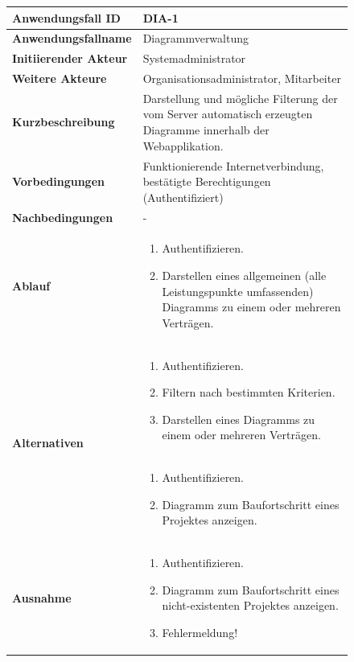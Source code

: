 \begin{figure}[h]
	\centering
	\begin{tabularx}{\textwidth}{ X | X }
		\textbf{Anwendungsfall ID} & DIA-1 \\ \hline
		\textbf{Anwendungsfallname} & Diagrammverwaltung \\ \hline
		\textbf{Initiierender Akteur} & Systemadministrator \\ \hline
		\textbf{Weitere Akteure} & Organisationsadministrator, Mitarbeiter \\ \hline
		\textbf{Kurzbeschreibung} & Darstellung und mögliche Filterung der vom Server automatisch erzeugten Diagramme innerhalb der Webapplikation.  \\ \hline
		\textbf{Vorbedingungen} & Funktionierende Internetverbindung, bestätigte Berechtigungen (Authentifiziert)  \\ \hline
		\textbf{Nachbedingungen} &  -  \\ \hline
		\textbf{Ablauf} &
		\begin{enumerate}
			\item Authentifizieren.
			\item Darstellen eines allgemeinen (alle Leistungspunkte umfassenden) Diagramms zu einem oder mehreren Verträgen.
		\end{enumerate} \\ \hline
		\multirow{2}{*}{\textbf{Alternativen}} &
		\begin{enumerate}
			\item Authentifizieren.
			\item Filtern nach bestimmten Kriterien.
			\item Darstellen eines Diagramms zu einem oder mehreren Verträgen.
		\end{enumerate} \\\cline{2-2} &
		\begin{enumerate}
			\item Authentifizieren.
			\item Diagramm zum Baufortschritt eines Projektes anzeigen.
		\end{enumerate}  \\ \hline
		\multirow{2}{*}{\textbf{Ausnahme}} &
		\begin{enumerate} %
			\item Authentifizieren.
			\item Diagramm zum Baufortschritt eines nicht-existenten Projektes anzeigen.
			\item Fehlermeldung!

\end{enumerate}
\end{tabularx}
\end{figure}
